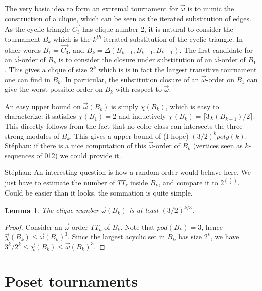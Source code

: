 \documentclass{article}
\newcommand{\diomega}{\vec\omega}
\newtheorem{lemma}{Lemma}
\newcommand{\stef}[1]{{\color{blue}Stéphan: #1}}
\begin{document}
{The very basic idea to form an extremal tournament for $\diomega$ is to mimic the construction of a clique, which can be seen as the iterated substitution of edges. As the cyclic triangle $\overrightarrow{C_3}$ has clique number 2, it is natural to consider the tournament $B_k$ which is the $k^{th}$-iterated substitution of the cyclic triangle. In other words $B_1= \overrightarrow{C_3}$, and $B_k = \Delta(B_{k-1},B_{k-1},B_{k-1})$. The first candidate for an $\diomega$-order of $B_k$ is to consider the closure under substitution of an $\diomega$-order of $B_1$. This gives a clique of size $2^k$ which is  is in fact the largest transitive tournament one can find in $B_k$. In particular, the substitution closure of an $\diomega$-order on $B_1$ can give the worst possible order on $B_k$ with respect to $\diomega$. 


An easy upper bound on $\diomega (B_k)$ is simply $\chi (B_k)$, which is easy to characterize: it satisfies $\chi (B_1)=2$ and inductively $\chi(B_k)=\lceil 3\chi(B_{k-1})/2\rceil$. This directly follows from the fact that no color class can intersects the three strong modules of $B_k$. This gives a upper bound of (I hope) $(3/2)^kpoly(k)$. \stef{if there is a nice computation of this $\diomega$-order of $B_k$ (vertices seen as $k$-sequences of 012) we could provide it.} 

\stef{An interesting question is how a random order would behave here. We just have to estimate the number of $TT_\ell$ inside $B_k$, and compare it to $2^{{\ell\choose 2}}$. Could be easier than it looks, the sommation is quite simple.}


\begin{lemma}
The clique number $\diomega (B_k)$ is at least $(3/2)^{k/3}$.
\end{lemma}

\begin{proof}
Consider an $\diomega$-order $TT_n$ of $B_k$. Note that $pod(B_k) = 3$, hence $\vec\chi(B_k)\leq \diomega (B_k)^3$. Since the largest acyclic set in $B_k$ has size $2^k$, we have $3^k/2^k\leq \vec\chi(B_k)\leq \diomega (B_k)^3$.
\end{proof}
}\fi



\section{Poset tournaments}\label{sec:poset_tournaments}
\end{document}
